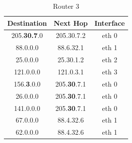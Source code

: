 \documentclass{WeSTassignment}
\begin{document}
\begin{table}[!ht]
\centering
\caption{Router 3}
\label{Router 3}
\begin{tabular}{ccc}
\hline
\multicolumn{1}{|c|}{\textbf{Destination}} & \multicolumn{1}{c|}{\textbf{Next Hop}} & \multicolumn{1}{c|}{\textbf{Interface}} \\ \hline
205.\textbf{30.7}.0                                  & 205.30.7.2                             & eth 0                                   \\
88.0.0.0                                   & 88.6.32.1                              & eth 1                                   \\
25.0.0.0                                   & 25.30.1.2                              & eth 2                                   \\
121.0.0.0                                  & 121.0.3.1                              & eth 3                                   \\
156.\textbf{3}.0.0                                  & 205.\textbf{30}.7.1                             & eth 0                                   \\
26.0.0.0                                   & 205.\textbf{30}.7.1                             & eth 0                                   \\
141.0.0.0                                  & 205.\textbf{30}.7.1                             & eth 0                                   \\
67.0.0.0                                   & 88.4.32.6                              & eth 1                                   \\
62.0.0.0                                   & 88.4.32.6                              & eth 1                                  
\end{tabular}
\end{table}
\clearpage
\end{document}
